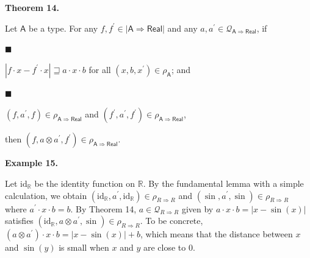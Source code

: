  
 
\par\medskip\noindent\textbf{Theorem 14.}\par
 
 
Let $\mathsf{A}$ be a type. For any $f,f^{\prime}\in|\mathsf{A}\Rightarrow\mathsf{Real}|$ and any $a,a^{\prime}\in\mathcal{Q}_{\mathsf{A}\Rightarrow\mathsf{Real}}$, if\par
  
\par\noindent  $\blacksquare$ 
 
$|f\cdot x-f^{\prime}\cdot x|\sqsupseteq a\cdot x\cdot b$ for all $(x,b,x^{\prime})\in\rho_{\mathsf{A}}$; and\par
 
 
 
\par\noindent  $\blacksquare$ 
 
$(f,a^{\prime},f)\in\rho_{\mathsf{A}\Rightarrow\mathsf{Real}}$ and $(f^{\prime},a^{\prime},f^{\prime})\in\rho_{\mathsf{A}\Rightarrow\mathsf{Real}}$,\par
 
 
  
then $(f,a\otimes a^{\prime},f^{\prime})\in\rho_{\mathsf{A}\Rightarrow\mathsf{Real}}$.\par
 
 
 
 
\par\medskip\noindent\textbf{Example 15.}\par
 
 
Let $\mathrm{id}_{\mathbb{R}}$ be the identity function on $\mathbb{R}$. By the fundamental lemma with a simple calculation, we obtain $(\mathrm{id}_{\mathbb{R}},a^{\prime},\mathrm{id}_{\mathbb{R}})\in\rho_{R%
\Rightarrow R}$ and $(\sin,a^{\prime},\sin)\in\rho_{R\Rightarrow R}$ where $a^{\prime}\cdot x\cdot b=b$. By Theorem 14, $a\in\mathcal{Q}_{R\Rightarrow R}$ given by $a\cdot x\cdot b=|x-\sin(x)|$ satisfies $(\mathrm{id}_{\mathbb{R}},a\otimes a^{\prime},\sin)\in\rho_{R\Rightarrow R}$. To be concrete, $(a\otimes a^{\prime})\cdot x\cdot b=|x-\sin(x)|+b$, which means that the distance between $x$ and $\sin(y)$ is small when $x$ and $y$ are close to $0$.\par
 
